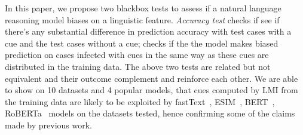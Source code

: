 In this paper, we propose two blackbox tests to assess if a natural language reasoning
model biases on a linguistic feature. \textit{Accuracy test} checks if see if there's
any substantial difference in prediction accuracy with test cases with a cue and the test cases
without a cue;  checks if the the model makes biased prediction on cases
infected with cues in the same way as these cues are distributed in the training data. 
The above two tests are related but not equivalent and their
outcome complement and reinforce each other.
We are able to show on 10 datasets and 4 popular models, that cues computed by LMI from the 
training data are likely to be exploited by fastText~\cite{joulin2017bag}, ESIM~\cite{peters2018deep}, BERT~\cite{devlin2018bert}, RoBERTa~\cite{liu2019roberta} models on the datasets tested, 
hence confirming some of the claims made by previous work.


%
%

